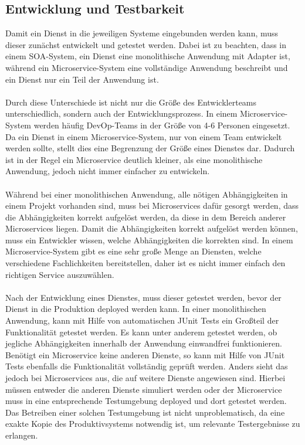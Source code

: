 \subsection{Entwicklung und Testbarkeit}
\label{subsec:EntwicklungUndTestbarkeit}
Damit ein Dienst in die jeweiligen Systeme eingebunden werden kann, muss dieser zunächst entwickelt und getestet werden. Dabei ist zu beachten, dass in einem SOA-System, ein Dienst eine monolithische Anwendung mit Adapter ist, während ein Microservice-System eine vollständige Anwendung beschreibt und ein Dienst nur ein Teil der Anwendung ist.
\\\\
Durch diese Unterschiede ist nicht nur die Größe des Entwicklerteams unterschiedlich, sondern auch der Entwicklungsprozess. In einem Microservice-System werden häufig DevOp-Teams in der Größe von 4-6 Personen eingesetzt. Da ein Dienst in einem Microservice-System, nur von einem Team entwickelt werden sollte, stellt dies eine Begrenzung der Größe eines Dienstes dar. Dadurch ist in der Regel ein Microservice deutlich kleiner, als eine monolithische Anwendung, jedoch nicht immer einfacher zu entwickeln.
\\\\
Während bei einer monolithischen Anwendung, alle nötigen Abhängigkeiten in einem Projekt vorhanden sind, muss bei Microservices dafür gesorgt werden, dass die Abhängigkeiten korrekt aufgelöst werden, da diese in dem Bereich anderer Microservices  liegen. Damit die Abhängigkeiten korrekt aufgelöst werden können, muss ein Entwickler wissen, welche Abhängigkeiten die korrekten sind. In einem Microservice-System gibt es eine sehr große Menge an Diensten, welche verschiedene Fachlichkeiten bereitstellen, daher ist es nicht immer einfach den richtigen Service auszuwählen.
\\\\
Nach der Entwicklung eines Dienstes, muss dieser getestet werden, bevor der Dienst in die Produktion deployed werden kann. In einer monolithischen Anwendung, kann mit Hilfe von automatischen JUnit Tests ein Großteil der Funktionalität getestet werden. Es kann unter anderem getestet werden, ob jegliche Abhängigkeiten innerhalb der Anwendung einwandfrei funktionieren. Benötigt ein Microservice keine anderen Dienste, so kann mit Hilfe von JUnit Tests ebenfalls die Funktionalität vollständig geprüft werden. Anders sieht das jedoch bei Microservices aus, die auf weitere Dienste angewiesen sind. Hierbei müssen entweder die anderen Dienste simuliert werden oder der Microservice muss in eine entsprechende Testumgebung deployed und dort getestet werden. Das Betreiben einer solchen Testumgebung ist nicht unproblematisch, da eine exakte Kopie des Produktivsystems notwendig ist, um relevante Testergebnisse zu erlangen.
